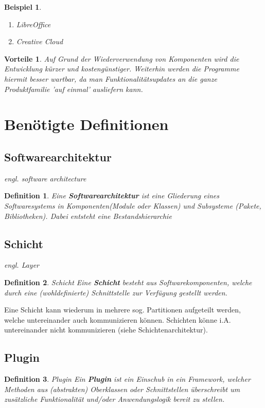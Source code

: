 \documentclass[a4paper]{article}
\theoremstyle{break}
\newtheorem{defi}{Definition}[section]
\newtheorem{ex}{Beispiel}[section]
\newtheorem{why}{Vorteile}[section]
\begin{document}
\begin{ex}
	\begin{enumerate}
		\item LibreOffice
		\item Creative Cloud
	\end{enumerate}
\end{ex}

\begin{why}
	Auf Grund der Wiederverwendung von Komponenten wird die Entwicklung kürzer und kostengünstiger. Weiterhin werden die Programme hiermit besser wartbar, da man Funktionalitätsupdates an die ganze Produktfamilie 'auf einmal' ausliefern kann.
\end{why}
\newpage
\section{Benötigte Definitionen}

\subsection{Softwarearchitektur}
\textit{engl. software architecture} \newline
\begin{defi}
	Eine \textbf{Softwarearchitektur} ist eine Gliederung eines Softwaresystems in Komponenten(Module oder Klassen) und Subsysteme (Pakete, Bibliotheken). Dabei entsteht eine Bestandshierarchie
\end{defi}

\subsection{Schicht}

\textit{engl. Layer}
\begin{defi}{Schicht}
	Eine \textbf{Schicht} besteht aus Softwarekomponenten, welche durch eine (wohldefinierte) Schnittstelle zur Verfügung gestellt werden.
\end{defi}

Eine Schicht kann wiederum in mehrere sog. Partitionen aufgeteilt werden, welche untereinander auch kommunizieren können. Schichten könne i.A. untereinander nicht kommunizieren (siehe Schichtenarchitektur).

\subsection{Plugin}
\begin{defi}{Plugin}
	Ein \textbf{Plugin} ist ein Einschub in ein Framework, welcher Methoden aus (abstrakten) Oberklassen oder Schnittstellen überschreibt um zusätzliche Funktionalität und/oder Anwendungslogik bereit zu stellen.
\end{defi}
\end{document}

